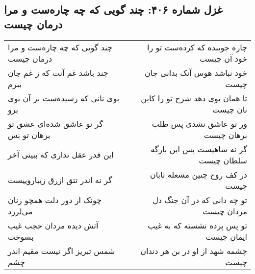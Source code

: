 \begin{center}
\section*{غزل شماره ۴۰۶: چند گویی که چه چاره‌ست و مرا درمان چیست}
\label{sec:0406}
\begin{longtable}{l p{0.5cm} r}
چند گویی که چه چاره‌ست و مرا درمان چیست
&&
چاره جوینده که کرده‌ست تو را خود آن چیست
\\
چند باشد غم آنت که ز غم جان ببرم
&&
خود نباشد هوس آنک بدانی جان چیست
\\
بوی نانی که رسیده‌ست بر آن بوی برو
&&
تا همان بوی دهد شرح تو را کاین نان چیست
\\
گر تو عاشق شده‌ای عشق تو برهان تو بس
&&
ور تو عاشق نشدی پس طلب برهان چیست
\\
این قدر عقل نداری که ببینی آخر
&&
گر نه شاهیست پس این بارگه سلطان چیست
\\
گر نه اندر تتق ازرق زیباروییست
&&
در کف روح چنین مشعله تابان چیست
\\
چونک از دور دلت همچو زنان می‌لرزد
&&
تو چه دانی که در آن جنگ دل مردان چیست
\\
آتش دیده مردان حجب غیب بسوخت
&&
تو پس پرده نشسته که به غیب ایمان چیست
\\
شمس تبریز اگر نیست مقیم اندر چشم
&&
چشمه شهد از او در بن هر دندان چیست
\\
\end{longtable}
\end{center}
